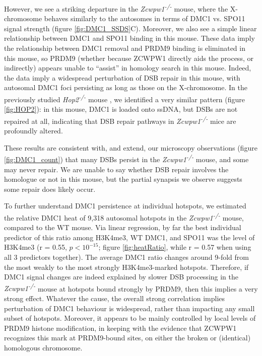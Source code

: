 However, we see a striking departure in the \textit{Zcwpw1\textsuperscript{-/-}} mouse, where the X-chromosome behaves similarly to the autosomes in terms of DMC1 vs. SPO11 signal strength (figure \ref{fig:DMC1_SSDS}C).
Moreover, we also see a simple linear relationship between DMC1 and SPO11 binding in this mouse.
These data imply the relationship between DMC1 removal and PRDM9 binding is eliminated in this mouse, so PRDM9 (whether because ZCWPW1 directly aids the process, or indirectly) appears unable to ``assist'' in homology search in this mouse.
Indeed, the data imply a widespread perturbation of DSB repair in this mouse, with autosomal DMC1 foci persisting as long as those on the X-chromosome.
In the previously studied \textit{Hop2\textsuperscript{-/-}} mouse \parencite{Khil2012Sensitive, Petukhova2003Hop2, Smagulova2011Genomewide}, we identified a very similar pattern (figure \ref{fig:HOP2}): in this mouse, DMC1 is loaded onto ssDNA, but DSBs are not repaired at all, indicating that DSB repair pathways in \textit{Zcwpw1\textsuperscript{-/-}} mice are profoundly altered.

These results are consistent with, and extend, our microscopy observations (figure \ref{fig:DMC1_count}) that many DSBs persist in the \textit{Zcwpw1\textsuperscript{-/-}} mouse, and some may never repair.
We are unable to say whether DSB repair involves the homologue or not in this mouse, but the partial synapsis we observe suggests some repair does likely occur.

To further understand DMC1 persistence at individual hotspots, we estimated the relative DMC1 heat of 9,318 autosomal hotspots in the \textit{Zcwpw1\textsuperscript{-/-}} mouse, compared to the WT mouse.
Via linear regression, by far the best individual predictor of this ratio among H3K4me3, WT DMC1, and SPO11 was the level of H3K4me3 (r = 0.55, $p < 10^{-15}$; figure \ref{fig:heatRatio}, while r = 0.57 when using all 3 predictors together).
The average DMC1 ratio changes around 9-fold from the most weakly to the most strongly H3K4me3-marked hotspots.
Therefore, if DMC1 signal changes are indeed explained by slower DSB processing in the \textit{Zcwpw1\textsuperscript{-/-}} mouse at hotspots bound strongly by PRDM9, then this implies a very strong effect.
Whatever the cause, the overall strong correlation implies perturbation of DMC1 behaviour is widespread, rather than impacting any small subset of hotspots.
Moreover, it appears to be mainly controlled by local levels of PRDM9 histone modification, in keeping with the evidence that ZCWPW1 recognizes this mark at PRDM9-bound sites, on either the broken or (identical) homologous chromosome.

